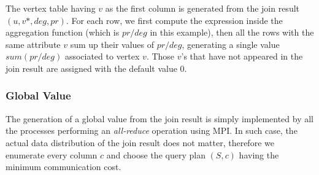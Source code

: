 \documentclass{sokendai_thesis} %
\begin{document}
The vertex table having $v$ as the first column is generated from the join result $(\mathit{u},\mathit{v}*,\mathit{deg},\mathit{pr})$.
For each row, we first compute the expression inside the aggregation function (which is $pr/deg$ in this example),
then all the rows with the same attribute $v$ sum up their values of $pr/deg$, generating a single value $sum(pr/deg)$ associated to vertex $v$.
Those $v$'s that have not appeared in the join result are assigned with the default value $0$.





\subsubsection{Global Value}

The generation of a global value from the join result is simply implemented by all the processes performing an \textit{all-reduce} operation using MPI.
In such case, the actual data distribution of the join result does not matter,
therefore we enumerate every column $c$ and choose the query plan $(S, c)$ having the minimum communication cost.
\end{document}
